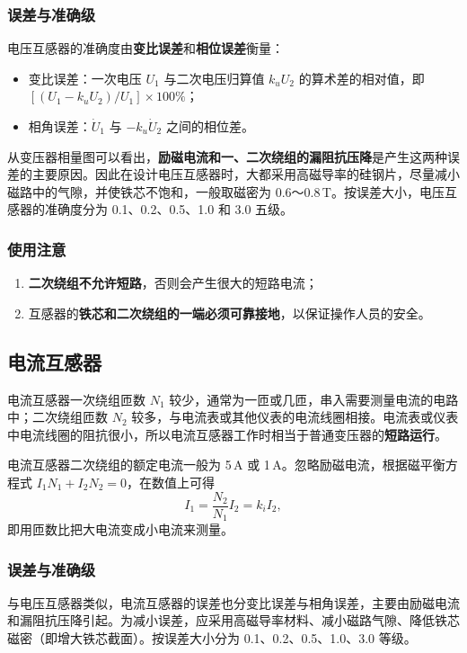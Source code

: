 \subsubsection{误差与准确级}
电压互感器的准确度由\textbf{变比误差}和\textbf{相位误差}衡量：
\begin{itemize}
  \item 变比误差：一次电压 $U_1$ 与二次电压归算值 $k_uU_2$ 的算术差的相对值，即 $\left[(U_1-k_uU_2)/U_1\right]\times100\%$；
  \item 相角误差：$\dot U_1$ 与 $-k_u\dot U_2$ 之间的相位差。
\end{itemize}
从变压器相量图可以看出，\textbf{励磁电流和一、二次绕组的漏阻抗压降}是产生这两种误差的主要原因。因此在设计电压互感器时，大都采用高磁导率的硅钢片，尽量减小磁路中的气隙，并使铁芯不饱和，一般取磁密为 0.6～0.8\,T。按误差大小，电压互感器的准确度分为 0.1、0.2、0.5、1.0 和 3.0 五级。

\subsubsection{使用注意}
\begin{enumerate}
  \item \textbf{二次绕组不允许短路}，否则会产生很大的短路电流；
  \item 互感器的\textbf{铁芯和二次绕组的一端必须可靠接地}，以保证操作人员的安全。
\end{enumerate}

\subsection{电流互感器}
电流互感器一次绕组匝数 $N_1$ 较少，通常为一匝或几匝，串入需要测量电流的电路中；二次绕组匝数 $N_2$ 较多，与电流表或其他仪表的电流线圈相接。电流表或仪表中电流线圈的阻抗很小，所以电流互感器工作时相当于普通变压器的\textbf{短路运行}。

电流互感器二次绕组的额定电流一般为 5\,A 或 1\,A。忽略励磁电流，根据磁平衡方程式 $I_1N_1+I_2N_2=0$，在数值上可得
\begin{equation}
I_1=\frac{N_2}{N_1}I_2=k_iI_2 ,
\end{equation}
即用匝数比把大电流变成小电流来测量。

\subsubsection{误差与准确级}
与电压互感器类似，电流互感器的误差也分变比误差与相角误差，主要由励磁电流和漏阻抗压降引起。为减小误差，应采用高磁导率材料、减小磁路气隙、降低铁芯磁密（即增大铁芯截面）。按误差大小分为 0.1、0.2、0.5、1.0、3.0 等级。

